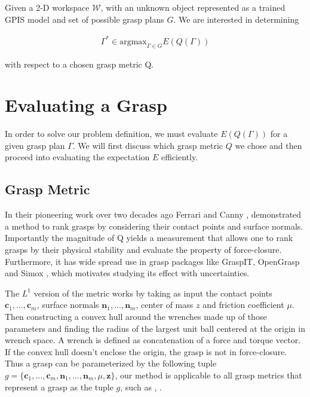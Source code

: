 \documentclass[letterpaper, 10 pt, conference]{ieeeconf}  %
\begin{document}
Given a 2-D workspace $\mathcal{W}$, with an unknown object represented as a trained GPIS model and set of possible grasp plans $G$. We are interested in determining 

\begin{align}\label{eq:problem_def}
\Gamma^* \in \mbox{argmax}_{\Gamma \in G} E(Q(\Gamma))
\end{align}

with respect to a chosen grasp metric Q. 

\section{Evaluating a Grasp}
In order to solve our problem definition, we must evaluate $E(Q(\Gamma))$ for a given grasp plan $\Gamma$. We will first discuss which grasp metric $Q$ we chose and then proceed into evaluating the expectation $E$ efficiently. 

\subsection{Grasp Metric}
In their pioneering work over two decades ago Ferrari and Canny \cite{ferrari1992}, demonstrated a method to rank grasps by considering their contact points and surface normals. Importantly the magnitude of Q yields a measurement that allows one to rank grasps by their physical stability and evaluate the property of force-closure. Furthermore, it has wide spread use in grasp packages like GraspIT\cite{miller2004graspit}, OpenGrasp\cite{73} and Simox \cite{vahrenkamp2010simo}, which motivates studying its effect with uncertainties. 

The $L^1$ version of the metric works by taking as input the contact points $\textbf{c}_1,...,\textbf{c}_m$, surface normals $\textbf{n}_1,...,\textbf{n}_m$, center of mass $z$ and friction coefficient $\mu$. Then constructing a convex hull around the wrenches made up of those parameters and finding the radius of the largest unit ball centered at the origin in wrench space. A wrench is defined as concatenation of a force and torque vector.  If the convex hull doesn't enclose the origin, the grasp is not in force-closure. Thus a grasp can be parameterized by the following tuple $g = \lbrace \textbf{c}_1,...,\textbf{c}_m,\textbf{n}_1,...,\textbf{n}_m,\mu, \textbf{z} \rbrace$, our method is applicable to all grasp metrics that represent a grasp as the tuple $g$, such as \cite{christopoulos2007handling}, \cite{li1988task}. 
\end{document}
